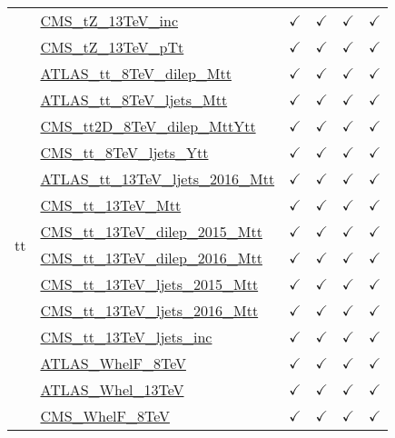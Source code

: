 \documentclass{article}
\begin{document}
\begin{longtable}{|c|l|c|c|c|c|}
 & \href{https://arxiv.org}{CMS_tZ_13TeV_inc}  & $\checkmark$ & $\checkmark$ & $\checkmark$ & $\checkmark$\\ \cline{2-6}
 & \href{https://arxiv.org}{CMS_tZ_13TeV_pTt}  & $\checkmark$ & $\checkmark$ & $\checkmark$ & $\checkmark$
\\ \hline
\multirow{17}{*}{tt}
 & \href{https://arxiv.org}{ATLAS_tt_8TeV_dilep_Mtt}  & $\checkmark$ & $\checkmark$ & $\checkmark$ & $\checkmark$\\ \cline{2-6}
 & \href{https://arxiv.org}{ATLAS_tt_8TeV_ljets_Mtt}  & $\checkmark$ & $\checkmark$ & $\checkmark$ & $\checkmark$\\ \cline{2-6}
 & \href{https://arxiv.org}{CMS_tt2D_8TeV_dilep_MttYtt}  & $\checkmark$ & $\checkmark$ & $\checkmark$ & $\checkmark$\\ \cline{2-6}
 & \href{https://arxiv.org}{CMS_tt_8TeV_ljets_Ytt}  & $\checkmark$ & $\checkmark$ & $\checkmark$ & $\checkmark$\\ \cline{2-6}
 & \href{https://arxiv.org}{ATLAS_tt_13TeV_ljets_2016_Mtt}  & $\checkmark$ & $\checkmark$ & $\checkmark$ & $\checkmark$\\ \cline{2-6}
 & \href{https://arxiv.org}{CMS_tt_13TeV_Mtt}  & $\checkmark$ & $\checkmark$ & $\checkmark$ & $\checkmark$\\ \cline{2-6}
 & \href{https://arxiv.org}{CMS_tt_13TeV_dilep_2015_Mtt}  & $\checkmark$ & $\checkmark$ & $\checkmark$ & $\checkmark$\\ \cline{2-6}
 & \href{https://arxiv.org}{CMS_tt_13TeV_dilep_2016_Mtt}  & $\checkmark$ & $\checkmark$ & $\checkmark$ & $\checkmark$\\ \cline{2-6}
 & \href{https://arxiv.org}{CMS_tt_13TeV_ljets_2015_Mtt}  & $\checkmark$ & $\checkmark$ & $\checkmark$ & $\checkmark$\\ \cline{2-6}
 & \href{https://arxiv.org}{CMS_tt_13TeV_ljets_2016_Mtt}  & $\checkmark$ & $\checkmark$ & $\checkmark$ & $\checkmark$\\ \cline{2-6}
 & \href{https://arxiv.org}{CMS_tt_13TeV_ljets_inc}  & $\checkmark$ & $\checkmark$ & $\checkmark$ & $\checkmark$\\ \cline{2-6}
 & \href{https://arxiv.org}{ATLAS_WhelF_8TeV}  & $\checkmark$ & $\checkmark$ & $\checkmark$ & $\checkmark$\\ \cline{2-6}
 & \href{https://arxiv.org}{ATLAS_Whel_13TeV}  & $\checkmark$ & $\checkmark$ & $\checkmark$ & $\checkmark$\\ \cline{2-6}
 & \href{https://arxiv.org}{CMS_WhelF_8TeV}  & $\checkmark$ & $\checkmark$ & $\checkmark$ & $\checkmark$\\ \cline{2-6}

\end{longtable}
\end{document}
